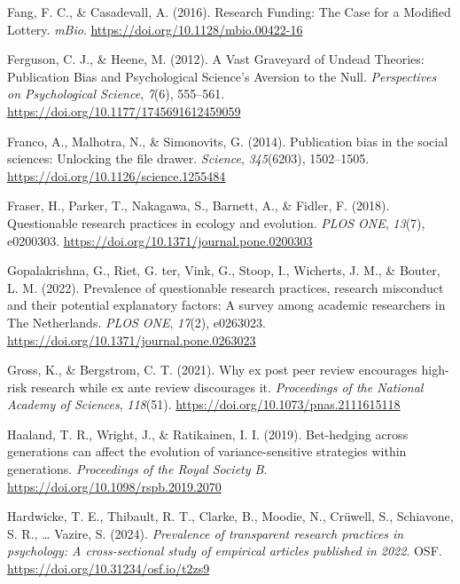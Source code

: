 \documentclass[
  british,
  a4paper,
  ,man,mask,floatsintext]{apa6}
\newlength{\cslhangindent}
\newenvironment{CSLReferences}[2] %
 {\begin{list}{}{%
  \setlength{\itemindent}{0pt}
  \setlength{\leftmargin}{0pt}
  \setlength{\parsep}{0pt}
  \ifodd #1
   \setlength{\leftmargin}{\cslhangindent}
   \setlength{\itemindent}{-1\cslhangindent}
  \fi
  \setlength{\itemsep}{#2\baselineskip}}}
 {\end{list}}
\begin{document}
\begin{CSLReferences}{1}{0}
Fang, F. C., \& Casadevall, A. (2016). Research {Funding}: The {Case} for a {Modified Lottery}. \emph{mBio}. \url{https://doi.org/10.1128/mbio.00422-16}

Ferguson, C. J., \& Heene, M. (2012). A {Vast Graveyard} of {Undead Theories}: {Publication Bias} and {Psychological Science}'s {Aversion} to the {Null}. \emph{Perspectives on Psychological Science}, \emph{7}(6), 555--561. \url{https://doi.org/10.1177/1745691612459059}

Franco, A., Malhotra, N., \& Simonovits, G. (2014). Publication bias in the social sciences: {Unlocking} the file drawer. \emph{Science}, \emph{345}(6203), 1502--1505. \url{https://doi.org/10.1126/science.1255484}

Fraser, H., Parker, T., Nakagawa, S., Barnett, A., \& Fidler, F. (2018). Questionable research practices in ecology and evolution. \emph{PLOS ONE}, \emph{13}(7), e0200303. \url{https://doi.org/10.1371/journal.pone.0200303}

Gopalakrishna, G., Riet, G. ter, Vink, G., Stoop, I., Wicherts, J. M., \& Bouter, L. M. (2022). Prevalence of questionable research practices, research misconduct and their potential explanatory factors: {A} survey among academic researchers in {The Netherlands}. \emph{PLOS ONE}, \emph{17}(2), e0263023. \url{https://doi.org/10.1371/journal.pone.0263023}

Gross, K., \& Bergstrom, C. T. (2021). Why ex post peer review encourages high-risk research while ex ante review discourages it. \emph{Proceedings of the National Academy of Sciences}, \emph{118}(51). \url{https://doi.org/10.1073/pnas.2111615118}

Haaland, T. R., Wright, J., \& Ratikainen, I. I. (2019). Bet-hedging across generations can affect the evolution of variance-sensitive strategies within generations. \emph{Proceedings of the Royal Society B}. \url{https://doi.org/10.1098/rspb.2019.2070}

Hardwicke, T. E., Thibault, R. T., Clarke, B., Moodie, N., Crüwell, S., Schiavone, S. R., \ldots{} Vazire, S. (2024). \emph{Prevalence of transparent research practices in psychology: {A} cross-sectional study of empirical articles published in 2022}. OSF. \url{https://doi.org/10.31234/osf.io/t2zs9}


\end{CSLReferences}
\end{document}
